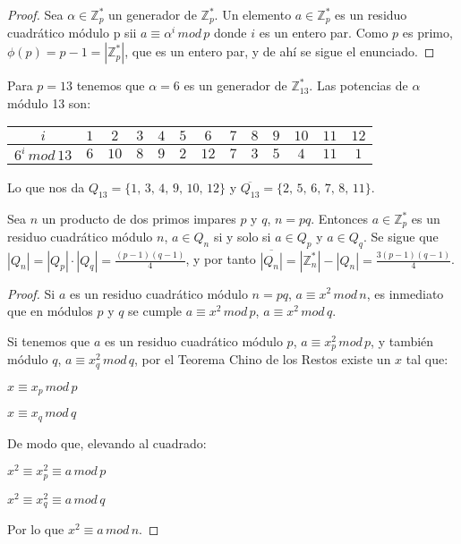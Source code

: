 \begin{proof}
	Sea $\alpha \in \mathbb{Z}^*_p$ un generador de $\mathbb{Z}^*_p$.
	Un elemento $a \in \mathbb{Z}^*_p$ es un residuo cuadrático módulo p sii $a \equiv \alpha^i \, mod \, p$ donde $i$ es un entero par. Como $p$ es primo, $\phi(p) = p-1 = |\mathbb{Z}^*_p|$, que es un entero par, y de ahí se sigue el enunciado.
\end{proof}

\begin{example}
	Para $p=13$ tenemos que $\alpha = 6$ es un generador de $\mathbb{Z}^*_{13}$. Las potencias de $\alpha$ módulo 13 son:
	
	\begin{tabular}{|c||c|c|c|c|c|c|c|c|c|c|c|c|}
		 \hline
			$i$ & $1$ & $2$ & $3$ & $4$ & $5$ & $6$ & $7$ & $8$ & $9$ & $10$ & $11$ & $12$ \\
			\hline
			$6^i \, mod \, 13$ & $6$ & $10$ & $8$ & $9$ & $2$ & $12$ & $7$ & $3$ & $5$ & $4$ & $11$ & $1$ \\
		 \hline
	\end{tabular}

	\hfil

	Lo que nos da $Q_{13} = \{1,\,3,\,4,\,9,\,10,\,12\}$ y $\overline{Q_{13}} = \{2,\,5,\,6,\,7,\,8,\,11\}$.
\end{example}

\begin{proposition}
	Sea $n$ un producto de dos primos impares $p$ y $q$, $n = pq$. Entonces  $a \in \mathbb{Z}^*_p$ es un residuo cuadrático módulo $n$, $a \in Q_n$ si y solo si $a \in Q_p$ y $a \in Q_q$. Se sigue que $|Q_n| = |Q_p|\cdot |Q_q| = \frac{(p-1)(q-1)}{4}$, y por tanto  $\overline{|Q_n|} = |\mathbb{Z}^*_n| - |Q_n| = \frac{3(p-1)(q-1)}{4}$.
\end{proposition}

\begin{proof}	
	Si $a$ es un residuo cuadrático módulo $n=pq$, $a \equiv x^2  \, mod \, n$, es inmediato que en módulos $p$ y $q$ se cumple $a \equiv x^2  \, mod \, p$, $a \equiv x^2  \, mod \, q$.
	
	Si tenemos que $a$ es un residuo cuadrático módulo $p$, $a \equiv x_p^2 \, mod \, p$, y también módulo $q$, $a \equiv x_q^2 \, mod \, q$, por el Teorema Chino de los Restos existe un $x$ tal que:
	
	$x \equiv x_p \, mod \, p$
	
	$x \equiv x_q \, mod \, q$
	
	De modo que, elevando al cuadrado:
	
	$x^2 \equiv x_p^2 \equiv a \, mod \, p$
	
	$x^2 \equiv x_q^2 \equiv a \, mod \, q$
	
	Por lo que $x^2 \equiv a \, mod \, n$.
	
\end{proof}



